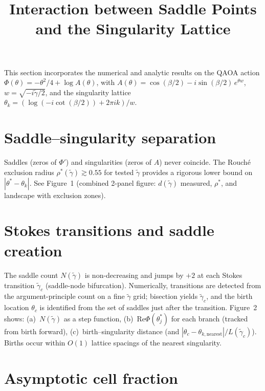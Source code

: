 \documentclass[11pt]{article}
\title{Interaction between Saddle Points and the Singularity Lattice}
\author{}
\date{}
\begin{document}
\maketitle

This section incorporates the numerical and analytic results on the QAOA action $\Phi(\theta) = -\theta^2/4 + \log A(\theta)$, with $A(\theta) = \cos(\beta/2) - i\sin(\beta/2)\, e^{\theta w}$, $w = \sqrt{-i\tilde{\gamma}/2}$, and the singularity lattice $\theta_k = (\log(-i\cot(\beta/2)) + 2\pi i k)/w$.

\section{Saddle--singularity separation}

Saddles (zeros of $\Phi'$) and singularities (zeros of $A$) never coincide. The Rouch\'e exclusion radius $\rho^*(\tilde{\gamma}) \gtrsim 0.55$ for tested $\tilde{\gamma}$ provides a rigorous lower bound on $|\theta^* - \theta_k|$. See Figure~1 (combined 2-panel figure: $d(\tilde{\gamma})$ measured, $\rho^*$, and landscape with exclusion zones).

\section{Stokes transitions and saddle creation}

The saddle count $N(\tilde{\gamma})$ is non-decreasing and jumps by $+2$ at each Stokes transition $\tilde{\gamma}_c$ (saddle-node bifurcation). Numerically, transitions are detected from the argument-principle count on a fine $\tilde{\gamma}$ grid; bisection yields $\tilde{\gamma}_c$, and the birth location $\theta_c$ is identified from the set of saddles just after the transition. Figure~2 shows: (a)~$N(\tilde{\gamma})$ as a step function, (b)~Re$\Phi(\theta_j^*)$ for each branch (tracked from birth forward), (c)~birth--singularity distance (and $|\theta_c - \theta_{k,\mathrm{nearest}}|/L(\tilde{\gamma}_c)$). Births occur within $O(1)$ lattice spacings of the nearest singularity.

\section{Asymptotic cell fraction}
\end{document}
